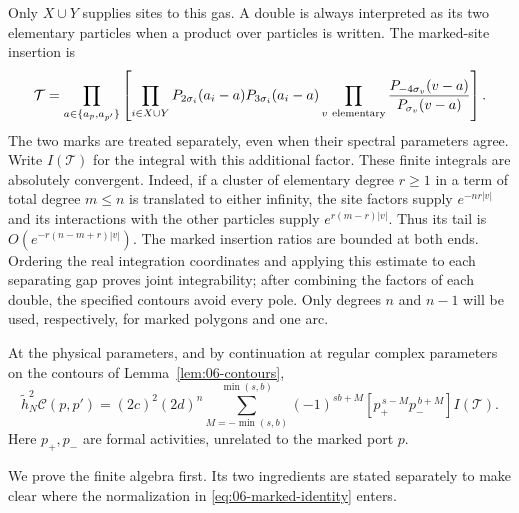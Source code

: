Only \(X\cup Y\) supplies sites to this gas.  A double is always
interpreted as its two elementary particles when a product over
particles is written.  The marked-site insertion is
\begin{equation}
 \mathcal T=
 \prod_{a\in\{a_p,a_{p'}\}}
 \left[
 \prod_{i\in X\cup Y}
 P_{2\sigma_i}(a_i-a)P_{3\sigma_i}(a_i-a)
 \prod_{v\ {\rm elementary}}
 \frac{P_{-4\sigma_v}(v-a)}{P_{\sigma_v}(v-a)}
 \right].
 \label{eq:06-insertion}
\end{equation}
The two marks are treated separately, even when their spectral
parameters agree.  Write \(I(\mathcal T)\) for the integral with this
additional factor. These finite integrals are absolutely convergent.
Indeed, if a cluster of elementary degree $r\ge1$ in a term of total
degree $m\le n$ is translated to either infinity, the site factors
supply $e^{-nr|v|}$ and its interactions with the other particles
supply $e^{r(m-r)|v|}$. Thus its tail is
$O(e^{-r(n-m+r)|v|})$. The marked insertion ratios are bounded at
both ends. Ordering the real integration coordinates and applying
this estimate to each separating gap proves joint integrability;
after combining the factors of each double, the specified contours
avoid every pole.
Only degrees $n$ and $n-1$ will be used, respectively, for marked
polygons and one arc.

\begin{theorem}
\label{thm:06-marked-identity}
At the physical parameters, and by continuation at regular complex
parameters on the contours of Lemma~\ref{lem:06-contours},
\begin{equation}
 \widetilde h_N^2\mathcal C(p,p')
 =(2c)^2(2d)^n
 \sum_{M=-\min(s,b)}^{\min(s,b)}
 (-1)^{sb+M}
 [p_+^{\,s-M}p_-^{\,b+M}]I(\mathcal T).
 \label{eq:06-marked-identity}
\end{equation}
Here \(p_+,p_-\) are formal activities, unrelated to the marked port
\(p\).
\end{theorem}

We prove the finite algebra first.  Its two ingredients are stated
separately to make clear where the normalization in
\eqref{eq:06-marked-identity} enters.

